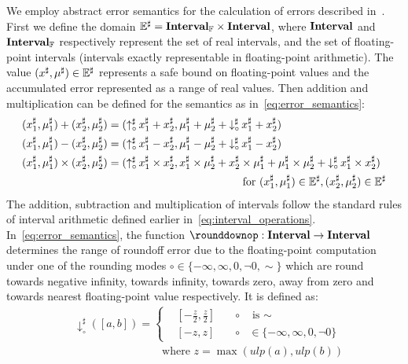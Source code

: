We employ abstract error semantics for the calculation of errors described
in~\cite{ioualalen, martel07}. First we define the domain $\mathbb{E}^\sharp
= \mathbf{Interval}_\mathbb{F}\times\mathbf{Interval}$, where $\mathbf{Interval}$ and
$\mathbf{Interval}_\mathbb{F}$ respectively represent the set of real intervals, and
the set of floating-point intervals (intervals exactly representable in
floating-point arithmetic). The value $(x^\sharp, \mu^\sharp) \in \mathbb{E}^\sharp$
represents a safe bound on floating-point values and the accumulated error
represented as a range of real values. Then addition and multiplication can be
defined for the semantics as in~\eqref{eq:error_semantics}:
\begin{equation}
    \begin{aligned}
        (x^\sharp_1, \mu^\sharp_1) + (x^\sharp_2, \mu^\sharp_2)
    &=  (\operatorname{\uparrow^\sharp_\circ}{x^\sharp_1 + x^\sharp_2},
         \mu^\sharp_1 + \mu^\sharp_2 +
         \operatorname{\downarrow^\sharp_\circ}{x^\sharp_1 + x^\sharp_2}) \\
        (x^\sharp_1, \mu^\sharp_1) - (x^\sharp_2, \mu^\sharp_2)
    &=  (\operatorname{\uparrow^\sharp_\circ}{x^\sharp_1 - x^\sharp_2},
         \mu^\sharp_1 - \mu^\sharp_2 +
         \operatorname{\downarrow^\sharp_\circ}{x^\sharp_1 - x^\sharp_2}) \\
        (x^\sharp_1, \mu^\sharp_1) \times (x^\sharp_2, \mu^\sharp_2)
    &=  (\operatorname{\uparrow^\sharp_\circ}{x^\sharp_1 \times x^\sharp_2},
            x^\sharp_1 \times \mu^\sharp_2 + x^\sharp_2 \times \mu^\sharp_1 +
            \mu^\sharp_1 \times \mu^\sharp_2 +
            \operatorname{\downarrow^\sharp_\circ}{x^\sharp_1 \times x^\sharp_2}) \\
    &\qquad\qquad\qquad\qquad\qquad\qquad\text{~for~}
        (x^\sharp_1, \mu^\sharp_1) \in \mathbb{E}^\sharp,
        (x^\sharp_2, \mu^\sharp_2) \in \mathbb{E}^\sharp
    \end{aligned}
    \label{eq:error_semantics}
\end{equation}
The addition, subtraction and multiplication of intervals follow the standard
rules of interval arithmetic defined earlier in~\eqref{eq:interval_operations}.
In~\eqref{eq:error_semantics}, the function $\rounddownop: \intervalset \to
\intervalset$ determines the range of roundoff error due to the floating-point
computation under one of the rounding modes $\circ \in \{ -\infty, \infty, 0,
\neg0, \sim \}$ which are round towards negative infinity, towards infinity,
towards zero, away from zero and towards nearest floating-point value
respectively. It is defined as:
\begin{equation}
    \begin{aligned}
        & \downarrow^\sharp_\circ([a, b]) = \left\{
            \begin{aligned}
                & \left[ -\frac{z}{2}, \frac{z}{2}\right]
                    & \quad \circ & \text{~is~}\sim \\
                & \left[ -z, z\right]
                    & \quad \circ & \in \{ -\infty, \infty, 0, \neg0 \}
            \end{aligned}
        \right. \\
        & \qquad\qquad\qquad\qquad \text{where~} z = \max(ulp(a), ulp(b))
    \end{aligned}
\end{equation}
